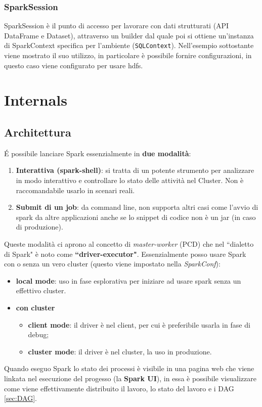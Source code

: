 \documentclass[12pt,italian]{article}
\begin{document}
\subsubsection{SparkSession}\label{sec:SparkSession} 
SparkSession è il punto di accesso per lavorare con dati strutturati (API DataFrame e Dataset), attraverso un builder dal quale poi si ottiene un'instanza di SparkContext specifica per l'ambiente (\texttt{SQLContext}). 
Nell'esempio sottostante viene mostrato il suo utilizzo, in particolare è possibile fornire configurazioni, in questo caso viene configurato per usare hdfs.

\section{Internals}
\subsection{Architettura}
É possibile lanciare Spark essenzialmente in \textbf{due modalità}:
\begin{enumerate}
	\item \textbf{Interattiva (spark-shell)}: si tratta di un potente strumento per analizzare in modo interattivo e controllare lo stato delle attività nel Cluster. Non è raccomandabile usarlo in scenari reali.
	\item \textbf{Submit di un job}: da command line, non supporta altri casi come l'avvio di spark da altre applicazioni anche se lo snippet di codice non è un jar (in caso di produzione).
\end{enumerate}
Queste modalità ci aprono al concetto di \textit{master-worker} (PCD) che nel ``dialetto di Spark" è noto come \textbf{``driver-executor"}.
Essenzialmente posso usare Spark con o senza un vero cluster (questo viene impostato nella \textit{SparkConf}):
\begin{itemize}
	\item \textbf{local mode}: uso in fase esplorativa per iniziare ad usare spark senza un effettivo cluster.
	\item \textbf{con cluster}
	\begin{itemize}
		\item \textbf{client mode}: il driver è nel client, per cui è preferibile usarla in fase di debug;
		\item \textbf{cluster mode}: il driver è nel cluster, la uso in produzione.
	\end{itemize}
\end{itemize}
Quando eseguo Spark lo stato dei processi è visibile in una pagina web che viene linkata nel esecuzione del progesso (la \textbf{Spark UI}), in essa è possibile visualizzare come viene effettivamente distribuito il lavoro, lo stato del lavoro e i DAG \ref{sec:DAG}. 
\end{document}

